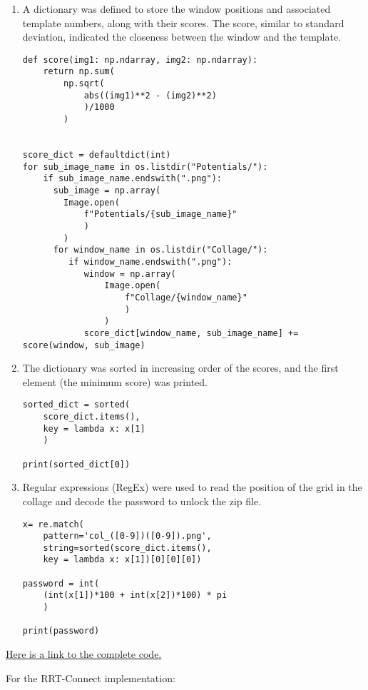 \documentclass[letterpaper, 10 pt, conference]{IEEEtran}
\begin{document}
\begin{enumerate}
\item A dictionary was defined to store the window positions and associated template numbers, along with their 
scores. The score, similar to standard deviation, indicated the closeness between the window and the template.

\begin{lstlisting}
def score(img1: np.ndarray, img2: np.ndarray):
    return np.sum(
        np.sqrt(
            abs((img1)**2 - (img2)**2)
            )/1000
        )


score_dict = defaultdict(int)
for sub_image_name in os.listdir("Potentials/"):
    if sub_image_name.endswith(".png"):
      sub_image = np.array(
        Image.open(
            f"Potentials/{sub_image_name}"
            )
        )
      for window_name in os.listdir("Collage/"):
         if window_name.endswith(".png"):
            window = np.array(
                Image.open(
                    f"Collage/{window_name}"
                    )
                )
            score_dict[window_name, sub_image_name] += score(window, sub_image)
\end{lstlisting}

\item The dictionary was sorted in increasing order of the scores, and the first element (the minimum score) 
was printed.

\begin{lstlisting}
sorted_dict = sorted(
    score_dict.items(), 
    key = lambda x: x[1]
    )

print(sorted_dict[0])
\end{lstlisting}

\item Regular expressions (RegEx) were used to read the position of the grid in the collage and decode the 
password to unlock the zip file.
\begin{lstlisting}
x= re.match(
    pattern='col_([0-9])([0-9]).png',
    string=sorted(score_dict.items(),
    key = lambda x: x[1])[0][0][0])

password = int(
    (int(x[1])*100 + int(x[2])*100) * pi
    )

print(password)
\end{lstlisting}
\end{enumerate}
\href{https://colab.research.google.com/drive/1B-TT8nmE13GdDY71ofqr2LRW5MCIAywc?usp=sharing}{Here is a link to the complete code.}


For the RRT-Connect implementation:
\end{document}
